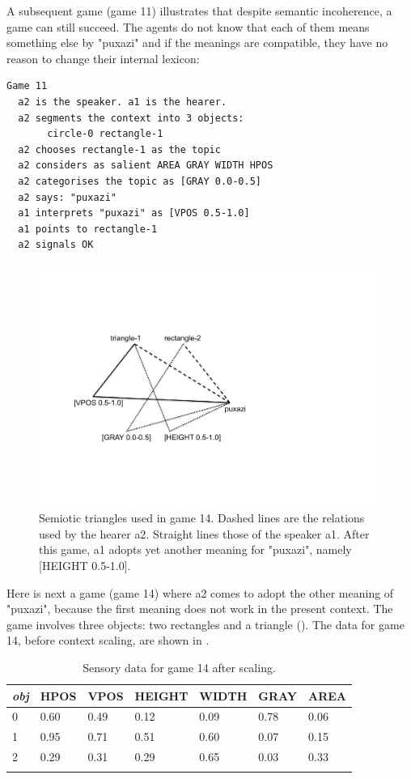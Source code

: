 A subsequent game (game 11) illustrates that despite 
semantic incoherence, a game can still succeed. The agents 
do not know that each of them means something else by 
"puxazi" and if the meanings are compatible, they 
have no reason to change their internal lexicon:
\begin{verbatim}
Game 11
  a2 is the speaker. a1 is the hearer. 
  a2 segments the context into 3 objects: 
       circle-0 rectangle-1
  a2 chooses rectangle-1 as the topic 
  a2 considers as salient AREA GRAY WIDTH HPOS 
  a2 categorises the topic as [GRAY 0.0-0.5]
  a2 says: "puxazi"
  a1 interprets "puxazi" as [VPOS 0.5-1.0]
  a1 points to rectangle-1
  a2 signals OK 
\end{verbatim}

\begin{figure}[htbp]
  \centerline{\includegraphics[width=.60\textwidth]{chap6/figs/triangle3}}
\caption{\label{triangle3} Semiotic triangles used in
game 14. Dashed lines are the relations used by 
the hearer {\bfshape  a2}. Straight lines those of the 
speaker {\bfshape  a1}. After this game, {\bfshape  a1}
adopts yet another meaning for "puxazi", namely 
{}[HEIGHT 0.5-1.0].}
\end{figure}
Here is next a game (game 14) where {\bfshape  a2} comes to adopt 
the other meaning of "puxazi", because the first
meaning does not work in the present context. 
The game involves three objects: two rectangles and a 
triangle ().
The data for game 14, before context scaling, are
shown in . 
\begin{table}
\begin{center}
\begin{tabular}{ l  l  l  l  l  l  l }
\lsptoprule
{\itshape obj} & HPOS & VPOS & HEIGHT & WIDTH & GRAY & AREA \\ \midrule
0 & 0.60 & 0.49 & 0.12 & 0.09 & 0.78 & 0.06\\ 
1 & 0.95 & 0.71 & 0.51 & 0.60 & 0.07 & 0.15\\ 
2 & 0.29 & 0.31 & 0.29 & 0.65 & 0.03 & 0.33\\ 
\lspbottomrule
\end{tabular}
\caption{\label{tab:game14} Sensory data for game 14 after scaling.}
\end{center}
\end{table}

